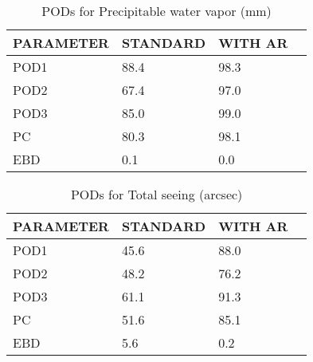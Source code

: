 \documentclass[11pt,english]{article}
\begin{document}
\begin{table}[]
\begin{center}
\begin{tabular}{|l|l|l|l|}
\hline
\multicolumn{1}{|c|}{\cellcolor[HTML]{C0C0C0}\textbf{PARAMETER}} & \multicolumn{1}{c|}{\cellcolor[HTML]{C0C0C0}\textbf{STANDARD}} & \multicolumn{1}{c|}{\cellcolor[HTML]{C0C0C0}\textbf{WITH AR}} \\
\hline
\cellcolor[HTML]{C0C0C0}POD1  & 88.4                                & 98.3         \\
\cellcolor[HTML]{C0C0C0}POD2  & 67.4                                & 97.0         \\
\cellcolor[HTML]{C0C0C0}POD3  & 85.0                                & 99.0         \\
\cellcolor[HTML]{C0C0C0}PC    & 80.3                                  & 98.1           \\
\cellcolor[HTML]{C0C0C0}EBD   & 0.1                                 & 0.0          \\
\hline
\end{tabular}
\caption{PODs for Precipitable water vapor (mm)}
\end{center}
\end{table}
\begin{table}[]
\begin{center}
\begin{tabular}{|l|l|l|l|}
\hline
\multicolumn{1}{|c|}{\cellcolor[HTML]{C0C0C0}\textbf{PARAMETER}} & \multicolumn{1}{c|}{\cellcolor[HTML]{C0C0C0}\textbf{STANDARD}} & \multicolumn{1}{c|}{\cellcolor[HTML]{C0C0C0}\textbf{WITH AR}} \\
\hline
\cellcolor[HTML]{C0C0C0}POD1  & 45.6                                & 88.0         \\
\cellcolor[HTML]{C0C0C0}POD2  & 48.2                                & 76.2         \\
\cellcolor[HTML]{C0C0C0}POD3  & 61.1                                & 91.3         \\
\cellcolor[HTML]{C0C0C0}PC    & 51.6                                  & 85.1           \\
\cellcolor[HTML]{C0C0C0}EBD   & 5.6                                 & 0.2          \\
\hline
\end{tabular}
\caption{PODs for Total seeing (arcsec)}
\end{center}
\end{table}
\end{document}
